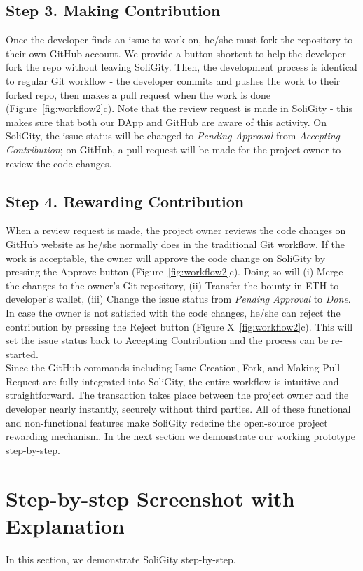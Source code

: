 \documentclass[12pt]{article}
\renewcommand{\_}{\kern-1.5pt\textunderscore\kern-1.5pt}
\begin{document}
\subsection*{Step 3. Making Contribution}

Once the developer finds an issue to work on, he/she must fork the repository to their own GitHub account. We provide a button shortcut to help the developer fork the repo without leaving SoliGity. Then, the development process is identical to regular Git workflow - the developer commits and pushes the work to their forked repo, then makes a pull request when the work is done (Figure~\ref{fig:workflow2}c). Note that the review request is made in SoliGity - this makes sure that both our DApp and GitHub are aware of this activity. On SoliGity, the issue status will be changed to \textit{Pending Approval} from \textit{Accepting Contribution}; on GitHub, a pull request will be made for the project owner to review the code changes.

\subsection*{Step 4. Rewarding Contribution}
When a review request is made, the project owner reviews the code changes on GitHub website as he/she normally does in the traditional Git workflow. If the work is acceptable, the owner will approve the code change on SoliGity by pressing the Approve button (Figure~\ref{fig:workflow2}c). Doing so will (i) Merge the changes to the owner’s Git repository,
(ii) Transfer the bounty in ETH to developer’s wallet,
(iii) Change the issue status from \textit{Pending Approval} to \textit{Done}. In case the owner is not satisfied with the code changes, he/she can reject the contribution by pressing the Reject button (Figure X~\ref{fig:workflow2}c). This will set the issue status back to Accepting Contribution and the process can be re-started.  \\


\noindent Since the GitHub commands including Issue Creation, Fork, and Making Pull Request are fully integrated into SoliGity, the entire workflow is intuitive and straightforward. The transaction takes place between the project owner and the developer nearly instantly, securely without third parties. All of these functional and non-functional features make SoliGity redefine the open-source project rewarding mechanism. In the next section we demonstrate our working prototype step-by-step.

\section{Step-by-step Screenshot with Explanation}
In this section, we demonstrate SoliGity step-by-step. 
\end{document}
